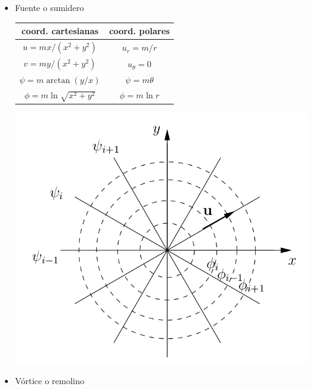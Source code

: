 \begin{itemize}
\begin{minipage}[c]{0.4\textwidth}
	\end{minipage}

\item{Fuente o sumidero}
	
	\begin{minipage}[c]{0.6\textwidth}%
		\begin{tabular}{|c|c|}
			\hline 
			coord. cartesianas  & coord. polares \tabularnewline
			\hline 
			$u=m{x}/{(x^{2}+y^{2})}$  & $u_{r}={m}/{r}$ \tabularnewline
			$v=m{y}/{(x^{2}+y^{2})}$  & $u_{\theta}=0$ \tabularnewline
			$\psi=m\arctan({y}/{x})$  & $\psi=m\theta$ \tabularnewline
			$\phi=m\ln\sqrt{x^{2}+y^{2}}$  & $\phi=m\ln r$ \tabularnewline
			\hline 
		\end{tabular}%
	\end{minipage}%
	\begin{minipage}[c]{0.4\textwidth}%
\begin{center}
	\includegraphics[width=\linewidth]{TeX_files/chapter09-Externo/fuente}
\end{center}
	\end{minipage}

\item{Vórtice o remolino}
	

\end{itemize}
